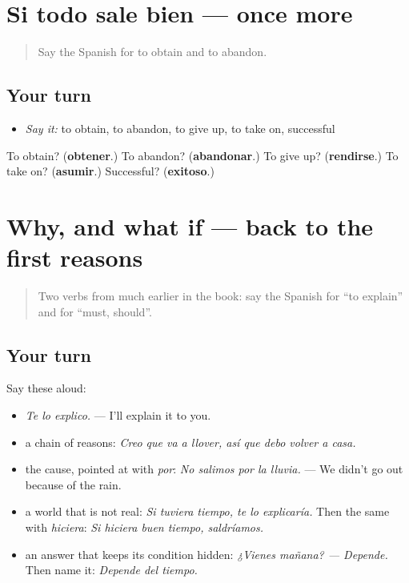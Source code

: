 \section[(dialogue)]{Si todo sale bien — once more}

\label{lesson:ES-R639-repaso-final-639}



\begin{quote}
Say the Spanish for to obtain and to abandon.
\end{quote}

\subsection*{Your turn}
\begin{itemize}
\raggedright
  \item \emph{Say it:} to obtain, to abandon, to give up, to take on, successful
\end{itemize}

\begin{tcolorbox}[breakable,colback=teal!4,colframe=teal!35!black,title={Before you move on}]
To obtain? (\textbf{obtener}.) To abandon? (\textbf{abandonar}.) To give up? (\textbf{rendirse}.) To take on? (\textbf{asumir}.) Successful? (\textbf{exitoso}.)
\end{tcolorbox}
\section[(dialogue)]{Why, and what if — back to the first reasons}

\label{lesson:ES-R639-repaso-por-que-y-si}



\begin{quote}
Two verbs from much earlier in the book: say the Spanish for \textquotedblleft{}to explain\textquotedblright{} and for \textquotedblleft{}must, should\textquotedblright{}.
\end{quote}

\subsection*{Your turn}
Say these aloud:

\begin{itemize}
\raggedright
  \item \emph{Te lo explico.} — I'll explain it to you.
  \item a chain of reasons: \emph{Creo que va a llover, así que debo volver a casa.}
  \item the cause, pointed at with \emph{por}: \emph{No salimos por la lluvia.} — We didn't go out because of the rain.
  \item a world that is not real: \emph{Si tuviera tiempo, te lo explicaría.} Then the same with \emph{hiciera}: \emph{Si hiciera buen tiempo, saldríamos.}
  \item an answer that keeps its condition hidden: \emph{¿Vienes mañana? — Depende.} Then name it: \emph{Depende del tiempo.}
\end{itemize}

